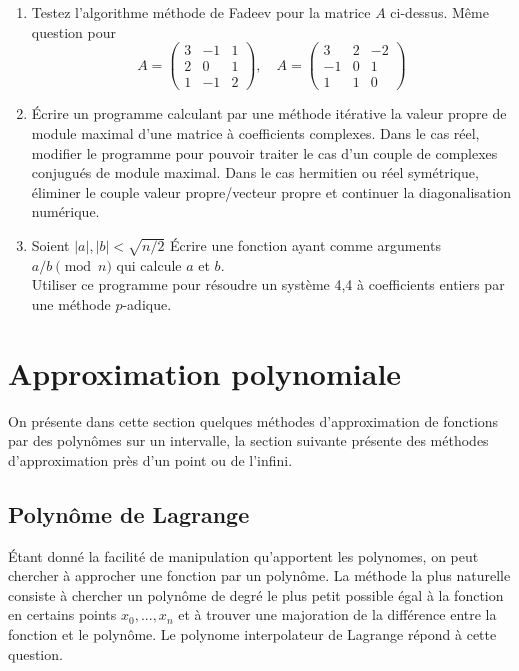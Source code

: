 \documentclass[a4paper,11pt]{article}
\begin{document}
\begin{enumerate}
des 1 ailleurs.
\'Ecrire un programme mettant en oeuvre cette recherche, testez-le avec
une matrice al\'eatoire de taille 30.
\item Testez l'algorithme méthode de Fadeev pour la matrice $A$ ci-dessus.
Même question pour 
\[ A=\left(\begin{array}{ccc}
 3 & -1 & 1 \\
2 &0 &1 \\
1 & -1 & 2 
\end{array}\right), \quad 
A=\left(\begin{array}{ccc}
 3 & 2 & -2 \\
-1 &0 &1 \\
1 & 1 & 0 
\end{array}\right) 
 \]
\item \'Ecrire un programme calculant par une méthode itérative
la valeur propre de module maximal d'une matrice à coefficients
complexes. Dans le cas réel, modifier le programme pour pouvoir
traiter le cas d'un couple de complexes conjugués de module maximal.
Dans le cas hermitien ou réel symétrique, éliminer le couple valeur
propre/vecteur propre et continuer la diagonalisation numérique.
\item Soient $|a|,|b|<\sqrt{n/2}$
\'Ecrire une fonction ayant comme arguments $a/b \pmod n$ 
qui calcule $a$ et $b$.\\
Utiliser ce programme pour résoudre un système 4,4 à coefficients entiers
par une méthode $p$-adique.
\end{enumerate}

\pagebreak


\section{Approximation polynomiale} \label{sec:interp}
On présente dans cette section quelques méthodes d'approximation
de fonctions par des polynômes sur un intervalle, la section suivante 
présente des méthodes d'approximation près d'un point ou de l'infini.

\subsection{Polyn\^ome de Lagrange} 
\'Etant donn\'e la facilit\'e de manipulation qu'apportent les
polynomes, on peut chercher \`a approcher une fonction par un
polyn\^ome. La m\'ethode la plus naturelle consiste \`a chercher
un polyn\^ome de degr\'e le plus petit possible
\'egal \`a la fonction en certains points $x_0,...,x_n$
et \`a trouver une majoration de la diff\'erence entre la fonction
et le polyn\^ome.
Le polynome interpolateur de Lagrange r\'epond \`a cette question.
\end{document}
